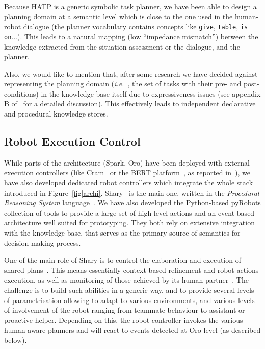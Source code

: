 \documentclass[preprint,3p,times]{elsarticle}
\newcommand{\ie}{{\textit{i.e.\ }}}
\begin{document}
Because HATP is a generic symbolic task planner, we have been able to design a
planning domain at a semantic level which is close to the one used in the
human-robot dialogue (the planner vocabulary contains concepts like
\texttt{give}, \texttt{table}, \texttt{is on}...). This leads to a natural
mapping (low ``impedance mismatch'') between the knowledge extracted from the situation
assessment or the dialogue, and the planner.

Also, we would like to mention that, after some research we have decided against
representing the planning domain (\ie, the set of tasks with their pre- and
post-conditions) in the knowledge base itself due to expressiveness issues (see
appendix B of~\cite{Lemaignan2012a} for a detailed discussion). This effectively
leads to independent declarative and procedural knowledge stores.

\subsection{Robot Execution Control}
\label{sect|ctrl}

While parts of the architecture ({\sc Spark}, {\sc Oro}) have been deployed with
external execution controllers (like {\sc Cram}~\cite{Beetz2010} or the BERT
platform~\cite{Lallee2010b}, as reported in~\cite{Lemaignan2010}), we have also
developed dedicated robot controllers which integrate the whole stack introduced
in Figure~\ref{fig|archi}. {\sc Shary}~\cite{clodic2008shary} is the main one,
written in the \emph{Procedural Reasoning System} language~\cite{Ingrand1996}.
We have also developed the Python-based {\sc pyRobots} collection of tools to
provide a large set of high-level actions and an event-based architecture well
suited for prototyping.  They both rely on extensive integration with the knowledge
base, that serves as the primary source of semantics for decision making process.

One of the main role of {\sc Shary} is to control the elaboration and execution
of shared plans~\cite{Grosz1996,Clark1996,Kemp2007}. This means essentially
context-based refinement and robot actions execution, as well as monitoring of
those achieved by its human partner~\cite{Breazeal2003}. The challenge is to
build such abilities in a generic way, and to provide several levels of
parametrisation allowing to adapt to various environments, and various levels of
involvement of the robot ranging from teammate behaviour to assistant or
proactive helper.  Depending on this, the robot controller invokes the various
human-aware planners and will react to events detected at {\sc Oro} level (as
described below).
\end{document}
